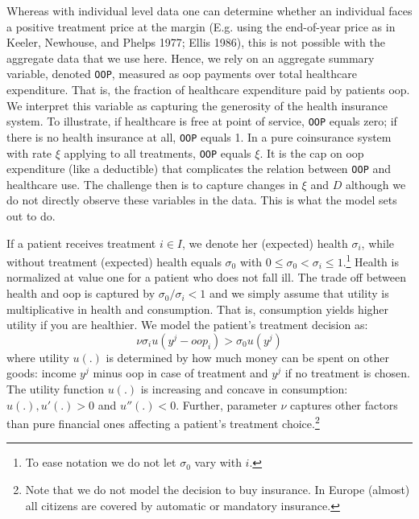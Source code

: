 \documentclass[a4paper,12pt]{article}
\makeatletter
\newcommand{\citeprocitem}[2]{\hyper@linkstart{cite}{citeproc_bib_item_#1}#2\hyper@linkend}
\makeatother
\begin{document}
Whereas with individual level data one can determine whether an individual faces a positive treatment price at the margin (E.g. using the end-of-year price as in \citeprocitem{14}{Keeler, Newhouse, and Phelps 1977}; \citeprocitem{10}{Ellis 1986}), this is not possible with the aggregate data that we use here. Hence, we rely on an aggregate summary variable, denoted \texttt{OOP}, measured as oop payments over total healthcare expenditure. That is, the fraction of healthcare expenditure paid by patients oop. We interpret this variable as capturing the generosity of the health insurance system. To illustrate, if healthcare is free at point of service, \texttt{OOP} equals zero; if there is no health insurance at all, \texttt{OOP} equals 1. In a pure coinsurance system with rate \(\xi\) applying to all treatments, \texttt{OOP} equals \(\xi\). It is the cap on oop expenditure (like a deductible) that complicates the relation between \texttt{OOP} and healthcare use. The challenge then is to capture changes in \(\xi\) and \(D\) although we do not directly observe these variables in the data. This is what the model sets out to do.

If a patient receives treatment \(i \in I\), we denote her (expected) health \(\sigma_i\), while without treatment (expected) health equals \(\sigma_0\) with \(0 \leq \sigma_0 < \sigma_i \leq 1\).\footnote{To ease notation we do not let \(\sigma_0\) vary with \(i\).} Health is normalized at value one for a patient who does not fall ill. The trade off between health and oop is captured by \(\sigma_0/\sigma_i <1\) and we simply assume that utility is multiplicative in health and consumption. That is, consumption yields higher utility if you are healthier. We model the patient's treatment decision as:
\begin{equation}
\label{eq:1}
\nu \sigma_i u(y^j-oop_i) > \sigma_0 u(y^j)
\end{equation}
where utility \(u(.)\) is determined by how much money can be spent on other goods: income \(y^j\) minus oop in case of treatment and \(y^j\) if no treatment is chosen. The utility function \(u(.)\) is increasing and concave in consumption: \(u(.), u'(.) >0\) and \(u''(.) < 0\). Further, parameter \(\nu\) captures other factors than pure financial ones affecting a patient's treatment choice.\footnote{Note that we do not model the decision to buy insurance. In Europe (almost) all citizens are covered by automatic or mandatory insurance.}
\end{document}
